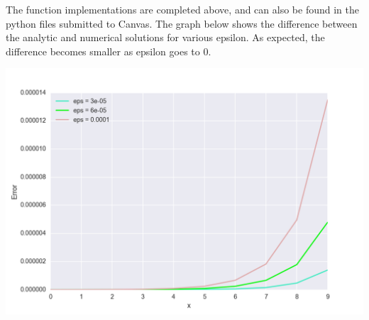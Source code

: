 \documentclass[submit]{harvardml}
\begin{document}
\newpage
The function implementations are completed above, and can also be found in the python files submitted to Canvas. The graph below shows the difference between the analytic and numerical solutions for various epsilon. As expected, the difference becomes smaller as epsilon goes to 0.

\begin{center}
	\includegraphics[scale=0.5]{6}
\end{center}
\end{document}

